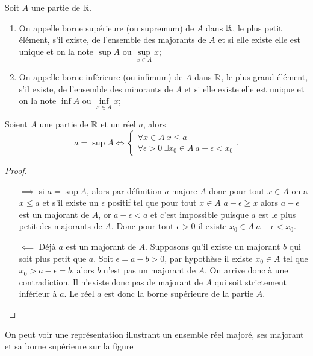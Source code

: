 Soit \(A\) une partie de \(\mathbb{R}\).
\begin{defdef}
  \begin{enumerate}
  \item On appelle borne supérieure (ou supremum) de \(A\) dans \(\mathbb{R}\), le plus petit élément, s'il existe, de l'ensemble des majorants de \(A\) et si elle existe elle est unique et on la note \(\sup A\) ou \(\sup\limits_{x\in A} x\);
\item On appelle borne inférieure (ou infimum) de \(A\) dans \(\mathbb{R}\), le plus grand élément, s'il existe, de l'ensemble des minorants de \(A\) et si elle existe elle est unique et on la note \(\inf A\) ou \(\inf\limits_{x\in A} x\);
  \end{enumerate}
\end{defdef}
\begin{theo}
  Soient \(A\) une partie de \(\mathbb{R}\) et un réel \(a\), alors
  \begin{equation}
    a=\sup A \iff \begin{cases} \forall x \in A \ x\leqslant a \\  \forall \epsilon >0 \ \exists x_0\in A \ a-\epsilon<x_0\end{cases}.
  \end{equation}
\end{theo}
\begin{proof}
  \begin{itemize}
  \item[\(\implies\)] si \(a=\sup A\), alors par définition \(a\) majore \(A\) donc pour tout \(x \in A\) on a \(x\leqslant a\) et s'il existe un \(\epsilon\) positif tel que pour tout \(x\in A\) \(a-\epsilon\geqslant x\) alors \(a-\epsilon\) est un majorant de \(A\), or \(a-\epsilon<a\) et c'est impossible puisque \(a\) est le plus petit des majorants de \(A\). Donc pour tout \(\epsilon >0\) il existe \(x_0\in A \ a-\epsilon<x_0\).
  \item [\(\impliedby\)] Déjà \(a\) est un majorant de \(A\). Supposons qu'il existe un majorant \(b\) qui soit plus petit que \(a\). Soit \(\epsilon=a-b>0\), par hypothèse il existe \(x_0\in A\) tel que \(x_0>a-\epsilon=b\), alors \(b\) n'est pas un majorant de \(A\). On arrive donc à une contradiction. Il n'existe donc pas de majorant de \(A\) qui soit strictement inférieur à \(a\). Le réel \(a\) est donc la borne supérieure de la partie \(A\).
  \end{itemize}
\end{proof}
On peut voir une représentation illustrant un ensemble réel majoré, ses majorant et sa borne supérieure sur la figure~
